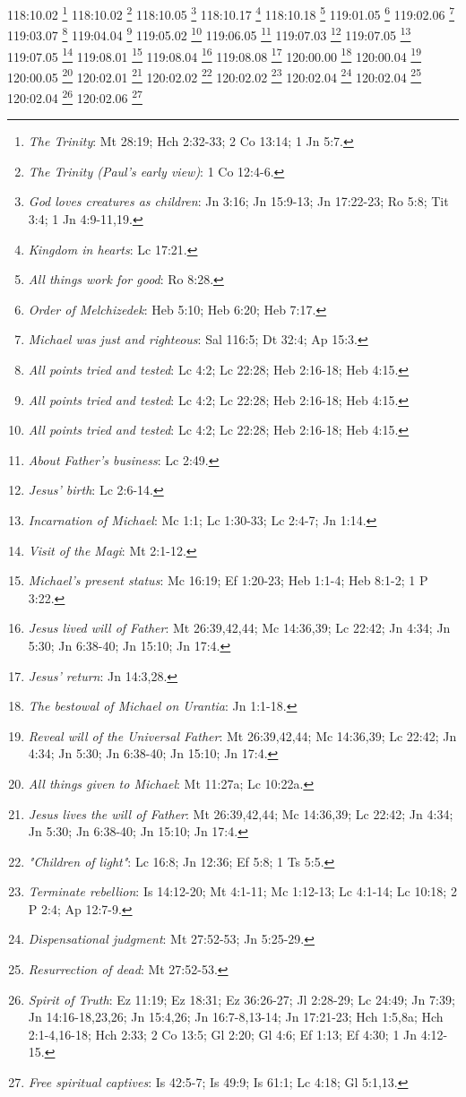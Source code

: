 {{{118:10.02 \footnote{\textit{The Trinity}: Mt 28:19; Hch 2:32-33; 2 Co 13:14; 1 Jn 5:7.}
118:10.02 \footnote{\textit{The Trinity (Paul's early view)}: 1 Co 12:4-6.}
118:10.05 \footnote{\textit{God loves creatures as children}: Jn 3:16; Jn 15:9-13; Jn 17:22-23; Ro 5:8; Tit 3:4; 1 Jn 4:9-11,19.}
118:10.17 \footnote{\textit{Kingdom in hearts}: Lc 17:21.}
118:10.18 \footnote{\textit{All things work for good}: Ro 8:28.}
119:01.05 \footnote{\textit{Order of Melchizedek}: Heb 5:10; Heb 6:20; Heb 7:17.}
119:02.06 \footnote{\textit{Michael was just and righteous}: Sal 116:5; Dt 32:4; Ap 15:3.}
119:03.07 \footnote{\textit{All points tried and tested}: Lc 4:2; Lc 22:28; Heb 2:16-18; Heb 4:15.}
119:04.04 \footnote{\textit{All points tried and tested}: Lc 4:2; Lc 22:28; Heb 2:16-18; Heb 4:15.}
119:05.02 \footnote{\textit{All points tried and tested}: Lc 4:2; Lc 22:28; Heb 2:16-18; Heb 4:15.}
119:06.05 \footnote{\textit{About Father's business}: Lc 2:49.}
119:07.03 \footnote{\textit{Jesus' birth}: Lc 2:6-14.}
119:07.05 \footnote{\textit{Incarnation of Michael}: Mc 1:1; Lc 1:30-33; Lc 2:4-7; Jn 1:14.}
119:07.05 \footnote{\textit{Visit of the Magi}: Mt 2:1-12.}
119:08.01 \footnote{\textit{Michael's present status}: Mc 16:19; Ef 1:20-23; Heb 1:1-4; Heb 8:1-2; 1 P 3:22.}
119:08.04 \footnote{\textit{Jesus lived will of Father}: Mt 26:39,42,44; Mc 14:36,39; Lc 22:42; Jn 4:34; Jn 5:30; Jn 6:38-40; Jn 15:10; Jn 17:4.}
119:08.08 \footnote{\textit{Jesus' return}: Jn 14:3,28.}
120:00.00 \footnote{\textit{The bestowal of Michael on Urantia}: Jn 1:1-18.}
120:00.04 \footnote{\textit{Reveal will of the Universal Father}: Mt 26:39,42,44; Mc 14:36,39; Lc 22:42; Jn 4:34; Jn 5:30; Jn 6:38-40; Jn 15:10; Jn 17:4.}
120:00.05 \footnote{\textit{All things given to Michael}: Mt 11:27a; Lc 10:22a.}
120:02.01 \footnote{\textit{Jesus lives the will of Father}: Mt 26:39,42,44; Mc 14:36,39; Lc 22:42; Jn 4:34; Jn 5:30; Jn 6:38-40; Jn 15:10; Jn 17:4.}
120:02.02 \footnote{\textit{"Children of light"}: Lc 16:8; Jn 12:36; Ef 5:8; 1 Ts 5:5.}
120:02.02 \footnote{\textit{Terminate rebellion}: Is 14:12-20; Mt 4:1-11; Mc 1:12-13; Lc 4:1-14; Lc 10:18; 2 P 2:4; Ap 12:7-9.}
120:02.04 \footnote{\textit{Dispensational judgment}: Mt 27:52-53; Jn 5:25-29.}
120:02.04 \footnote{\textit{Resurrection of dead}: Mt 27:52-53.}
120:02.04 \footnote{\textit{Spirit of Truth}: Ez 11:19; Ez 18:31; Ez 36:26-27; Jl 2:28-29; Lc 24:49; Jn 7:39; Jn 14:16-18,23,26; Jn 15:4,26; Jn 16:7-8,13-14; Jn 17:21-23; Hch 1:5,8a; Hch 2:1-4,16-18; Hch 2:33; 2 Co 13:5; Gl 2:20; Gl 4:6; Ef 1:13; Ef 4:30; 1 Jn 4:12-15.}
120:02.06 \footnote{\textit{Free spiritual captives}: Is 42:5-7; Is 49:9; Is 61:1; Lc 4:18; Gl 5:1,13.}
}}}
